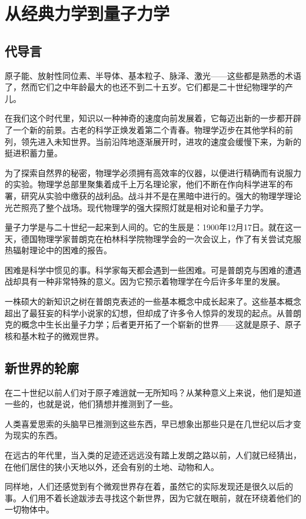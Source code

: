 \chapter{从经典力学到量子力学}

\section{代导言}

原子能、放射性同位素、半导体、基本粒子、脉泽、激光——这些都是熟悉的术语了，然而它们之中年龄最大的也还不到二十五岁。它们都是二十世纪物理学的产儿。

在我们这个时代里，知识以一种神奇的速度向前发展着，它每迈出新的一步都开辟了一个新的前景。古老的科学正焕发着第二个青春。物理学迈步在其他学科的前列，领先进入未知世界。当前沿阵地逐渐展开时，进攻的速度会缓慢下来，为新的挺进积蓄力量。

为了探索自然界的秘密，物理学必须拥有高效率的仪器，以便进行精确而有说服力的实验。物理学总部里聚集着成千上万名理论家，他们不断在作向科学进军的布署，研究从实验中缴获的战利品。战斗并不是在黑暗中进行的。强大的物理学理论光芒照亮了整个战场。现代物理学的强大探照灯就是相对论和量子力学。

量子力学是与二十世纪一起来到人间的。它的生辰是：1900年12月17日。就在这一天，德国物理学家普朗克在柏林科学院物理学会的一次会议上，作了有关尝试克服热辐射理论中的困难的报告。

困难是科学中惯见的事。科学家每天都会遇到一些困难。可是普朗克与困难的遭遇战却具有一种非常特殊的意义。因为它预示着物理学在今后许多年里的发展。

一株硕大的新知识之树在普朗克表述的一些基本概念中成长起来了。这些基本概念超出了最狂妄的科学小说家的幻想，但却成了许多令人惊异的发现的起点。从普朗克的概念中生长出量子力学；后者更开拓了一个崭新的世界——这就是原子、原子核和基木粒子的微观世界。

\section{新世界的轮廓}

在二十世纪以前人们对于原子难逍就一无所知吗？从某种意义上来说，他们是知道一些的，也就是说，他们猜想并推测到了一些。

人类喜爱思索的头脑早已推测到这些东西，早已想象出那些只是在几世纪以后才变为现实的东西。

在远古的年代里，当入类的足迹还远远没有踏上发朗之路以前，人们就已经猜出，在他们居住的狭小天地以外，还会有别的土地、动物和人。

同样地，人们还感觉到有个微观世界存在着，虽然它的实际发现还是很久以后的事。人们用不着长途跋涉去寻找这个新世界，因为它就在眼前，就在环绕着他们的一切物体中。

